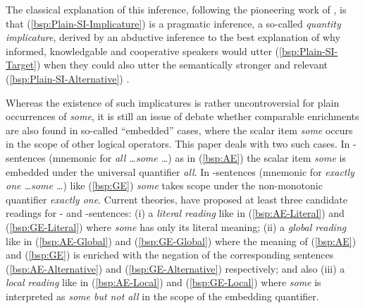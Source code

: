 \documentclass[fleqn,reqno,10pt]{article}
\newcommand{\as}{\acro{as}}
\renewcommand{\es}{\acro{es}}
\begin{document}
\noindent The classical explanation of this inference, following the
pioneering work of \citet{Grice1975:Logic-and-Conve}, is that
(\ref{bsp:Plain-SI-Implicature}) is a pragmatic inference, a so-called
\emph{quantity implicature}, derived by an abductive inference to the
best explanation of why informed, knowledgable and cooperative
speakers would utter (\ref{bsp:Plain-SI-Target}) when they could also
utter the semantically stronger and relevant
(\ref{bsp:Plain-SI-Alternative}) \citep[see][for a recent
overview]{Geurts2010:Quantity-Implic}.



Whereas the existence of such implicatures is rather uncontroversial
for plain occurrences of \emph{some}, it is still an issue of debate
whether comparable enrichments are also found in so-called
``embedded'' cases, where the scalar item \emph{some} occurs in the
scope of other logical operators. This paper deals with two such
cases.  In \as-sentences (mnemonic for \textit{all \dots some \dots})
as in (\ref{bsp:AE}) the scalar item \emph{some} is embedded under the
universal quantifier \emph{all}. In \es-sentences (mnemonic for
\textit{exactly one \dots some \dots}) like (\ref{bsp:GE}) \emph{some}
takes scope under the non-monotonic quantifier \emph{exactly one}.
Current theories, have proposed at least three candidate readings for
\as- and \es-sentences: (i) a \emph{literal reading} like in
(\ref{bsp:AE-Literal}) and (\ref{bsp:GE-Literal}) where \emph{some}
has only its literal meaning; (ii) a \emph{global reading} like in
(\ref{bsp:AE-Global}) and (\ref{bsp:GE-Global}) where the meaning of
(\ref{bsp:AE}) and (\ref{bsp:GE}) is enriched with the negation of the
corresponding sentences (\ref{bsp:AE-Alternative}) and
(\ref{bsp:GE-Alternative}) respectively; and also (iii) a \emph{local
  reading} like in (\ref{bsp:AE-Local}) and (\ref{bsp:GE-Local}) where
\emph{some} is interpreted as \emph{some but not all} in the scope of
the embedding quantifier.
\end{document}

